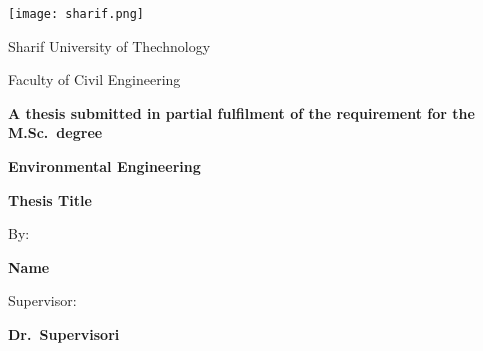 \begin{titlepage}
\vspace*{1cm}
\begin{center}
\texttt{[image: sharif.png]}

 \large
Sharif University of Thechnology


Faculty of Civil Engineering

\vspace*{1cm}
\large
\textbf{A thesis submitted in partial fulfilment of the requirement for the M.Sc.~degree}


\textbf{Environmental Engineering}

\vspace*{1.5cm}
\Huge
\textbf{Thesis Title}     
\vspace{1.5cm}

\Large

By:

\textbf{Name}
\vspace{1.5cm}

Supervisor:

\textbf{Dr.~Supervisori}
\vfill
\Large
\latintoday        
\end{center}
\end{titlepage}
